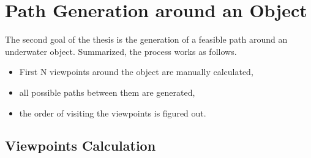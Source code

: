 %

\section{Path Generation around an Object}

The second goal of the thesis is the generation of a feasible path around an underwater object. Summarized, the process works as follows. 

\begin{itemize}
\item
First N viewpoints around the object are manually calculated,
\item
all possible paths between them are generated,
\item
the order of visiting the viewpoints is figured out.

\end{itemize}

\subsection{Viewpoints Calculation}

